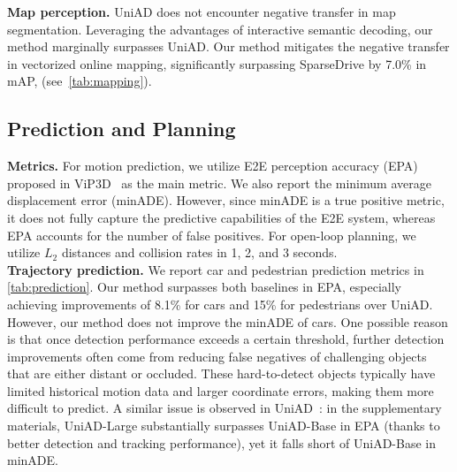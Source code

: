 \textbf{Map perception.} UniAD does not encounter negative transfer in map segmentation. Leveraging the advantages of interactive semantic decoding, our method marginally surpasses UniAD. Our method mitigates the negative transfer in vectorized online mapping, significantly surpassing SparseDrive by 7.0\% in mAP, \mbox{(see \cref{tab:mapping})}.


\subsection{Prediction and Planning}
\textbf{Metrics.} For motion prediction, we utilize \gls{E2E} perception accuracy (EPA) proposed in ViP3D~\cite{gu2023vip3d} as the main metric. We also report the minimum average displacement error (minADE). However, since minADE is a true positive metric, it does not fully capture the predictive capabilities of the \gls{E2E} system, whereas EPA accounts for the number of false positives. For open-loop planning, we utilize $L_2$ distances and collision rates in 1, 2, and 3 seconds.\\

\textbf{Trajectory prediction.} 
We report car and pedestrian prediction metrics in \cref{tab:prediction}. 
Our method surpasses both baselines in EPA, especially achieving improvements of 8.1\% for cars and 15\% for pedestrians over UniAD. 
However, our method does not improve the minADE of cars.
One possible reason is that once detection performance exceeds a certain threshold, further detection improvements often come from reducing false negatives of challenging objects that are either distant or occluded. These hard-to-detect objects typically have limited historical motion data and larger coordinate errors, making them more difficult to predict. A similar issue is observed in UniAD~\cite{hu2023planning}: in the supplementary materials, UniAD-Large substantially surpasses UniAD-Base in EPA (thanks to better detection and tracking performance), yet it falls short of UniAD-Base in minADE.
\\




